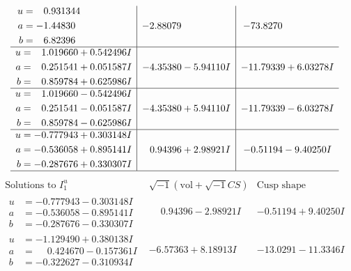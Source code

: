 \documentclass[1p]{elsarticle_modified}
\theoremstyle{definition}
\newcommand{\I}{\sqrt{-1}}
\begin{document}
$$\begin{array}{c|c|c}
\begin{aligned}
u &= \phantom{-}0.931344\phantom{ +0.000000I} \\
a &= -1.44830\phantom{ +0.000000I} \\
b &= \phantom{-}6.82396\phantom{ +0.000000I}\end{aligned}
 & -2.88079\phantom{ +0.000000I} & -73.8270\phantom{ +0.000000I} \\ \hline\begin{aligned}
u &= \phantom{-}1.019660 + 0.542496 I \\
a &= \phantom{-}0.251541 + 0.051587 I \\
b &= \phantom{-}0.859784 + 0.625986 I\end{aligned}
 & -4.35380 - 5.94110 I & -11.79339 + 6.03278 I \\ \hline\begin{aligned}
u &= \phantom{-}1.019660 - 0.542496 I \\
a &= \phantom{-}0.251541 - 0.051587 I \\
b &= \phantom{-}0.859784 - 0.625986 I\end{aligned}
 & -4.35380 + 5.94110 I & -11.79339 - 6.03278 I \\ \hline\begin{aligned}
u &= -0.777943 + 0.303148 I \\
a &= -0.536058 + 0.895141 I \\
b &= -0.287676 + 0.330307 I\end{aligned}
 & \phantom{-}0.94396 + 2.98921 I & -0.51194 - 9.40250 I\\
 \hline 
 \end{array}$$\newpage$$\begin{array}{c|c|c}  
\text{Solutions to }I^u_{1}& \I (\text{vol} + \sqrt{-1}CS) & \text{Cusp shape}\\
 \hline 
\begin{aligned}
u &= -0.777943 - 0.303148 I \\
a &= -0.536058 - 0.895141 I \\
b &= -0.287676 - 0.330307 I\end{aligned}
 & \phantom{-}0.94396 - 2.98921 I & -0.51194 + 9.40250 I \\ \hline\begin{aligned}
u &= -1.129490 + 0.380138 I \\
a &= \phantom{-}0.424670 - 0.157361 I \\
b &= -0.322627 - 0.310934 I\end{aligned}
 & -6.57363 + 8.18913 I & -13.0291 - 11.3346 I \\ \hline\begin{aligned}

\end{aligned}
\end{array}$$
\end{document}
